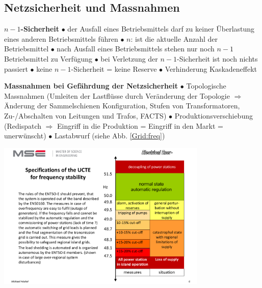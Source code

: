 	\subsection{Netzsicherheit und Massnahmen}
	\begin{minipage}[lt]{14cm}
		\textbf{$n-1$-Sicherheit}\newline
		$\bullet$ der Ausfall eines Betriebsmittels darf zu keiner Überlastung eines anderen Betriebsmittels führen  $\bullet$ $n$: ist die aktuelle Anzahl der Betriebsmittel  $\bullet$ nach Ausfall eines Betriebsmittels stehen nur noch $n-1$ Betriebsmittel zu Verfügung  $\bullet$ bei Verletzung der $n-1$-Sicherheit ist noch nichts passiert  $\bullet$ keine $n-1$-Sicherheit = keine Reserve  $\bullet$ Verhinderung Kaskadeneffekt \newline
		
		\textbf{Massnahmen bei Gefährdung der Netzsicherheit} \newline
		$\bullet$ Topologische Massnahmen (Umleiten der Lastflüsse durch Veränderung der Topologie $\Rightarrow$ Änderung der Sammelschienen Konfiguration, Stufen von Transformatoren, Zu-/Abschalten von Leitungen und Trafos, FACTS)  $\bullet$ Produktionsverschiebung (Redispatch $\Rightarrow$ Eingriff in die Produktion = Eingriff in den Markt = unerwünscht)  $\bullet$ Lastabwurf (siehe Abb. \ref{Grid:freq})
	\end{minipage}
	\begin{minipage}[rt]{5cm}
		\hfill
		\includegraphics[width=0.75\textwidth]{./images/frequenz.pdf}
		\label{Grid:freq}		
	\end{minipage}
	
